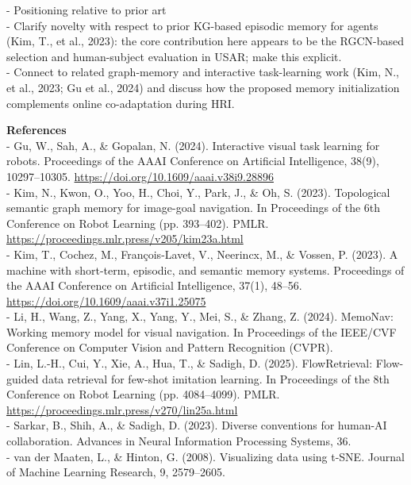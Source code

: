 \documentclass[letterpaper]{article} %
\begin{document}
- Positioning relative to prior art\\
\hspace*{1em}- Clarify novelty with respect to prior KG-based episodic memory for agents (Kim, T., et al., 2023): the core contribution here appears to be the RGCN-based selection and human-subject evaluation in USAR; make this explicit.\\
\hspace*{1em}- Connect to related graph-memory and interactive task-learning work (Kim, N., et al., 2023; Gu et al., 2024) and discuss how the proposed memory initialization complements online co-adaptation during HRI.

\textbf{References}\\
- Gu, W., Sah, A., \& Gopalan, N. (2024). Interactive visual task learning for robots. Proceedings of the AAAI Conference on Artificial Intelligence, 38(9), 10297–10305. \url{https://doi.org/10.1609/aaai.v38i9.28896}\\
- Kim, N., Kwon, O., Yoo, H., Choi, Y., Park, J., \& Oh, S. (2023). Topological semantic graph memory for image-goal navigation. In Proceedings of the 6th Conference on Robot Learning (pp. 393–402). PMLR. \url{https://proceedings.mlr.press/v205/kim23a.html}\\
- Kim, T., Cochez, M., François-Lavet, V., Neerincx, M., \& Vossen, P. (2023). A machine with short-term, episodic, and semantic memory systems. Proceedings of the AAAI Conference on Artificial Intelligence, 37(1), 48–56. \url{https://doi.org/10.1609/aaai.v37i1.25075}\\
- Li, H., Wang, Z., Yang, X., Yang, Y., Mei, S., \& Zhang, Z. (2024). MemoNav: Working memory model for visual navigation. In Proceedings of the IEEE/CVF Conference on Computer Vision and Pattern Recognition (CVPR).\\
- Lin, L.-H., Cui, Y., Xie, A., Hua, T., \& Sadigh, D. (2025). FlowRetrieval: Flow-guided data retrieval for few-shot imitation learning. In Proceedings of the 8th Conference on Robot Learning (pp. 4084–4099). PMLR. \url{https://proceedings.mlr.press/v270/lin25a.html}\\
- Sarkar, B., Shih, A., \& Sadigh, D. (2023). Diverse conventions for human-AI collaboration. Advances in Neural Information Processing Systems, 36.\\
- van der Maaten, L., \& Hinton, G. (2008). Visualizing data using t-SNE. Journal of Machine Learning Research, 9, 2579–2605.
\end{document}
